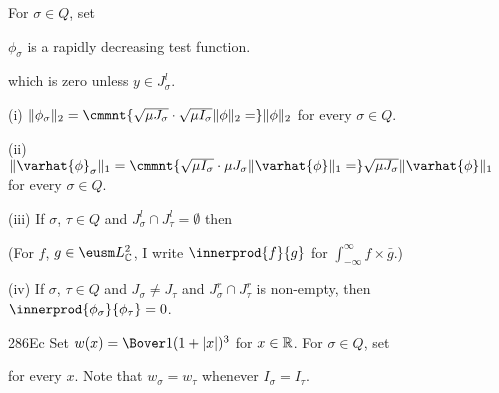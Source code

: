 For $\sigma\in Q$, set


\noindent{}$\phi_{\sigma}$ is a rapidly decreasing
test function.   


\noindent which is zero
unless $y\in J^l_{\sigma}$.   

\quad(i) $\|\phi_{\sigma}\|_2
=\cmmnt{\sqrt{\mu J_{\sigma}}\cdot\sqrt{\mu I_{\sigma}}\|\phi\|_2
=}\|\phi\|_2$
for every $\sigma\in Q$.

\quad(ii) $\|\varhat{\phi}_{\sigma}\|_1
=\cmmnt{\sqrt{\mu I_{\sigma}}\cdot\mu J_{\sigma}\|\varhat{\phi}\|_1
=}\sqrt{\mu J_{\sigma}}\|\varhat{\phi}\|_1$ for every $\sigma\in Q$.

\quad(iii) If $\sigma$, $\tau\in Q$ and
$J^l_{\sigma}\cap J^l_{\tau}=\emptyset$ then


\noindent{}(For $f$,
$g\in\eusm L_{\Bbb C}^2$, I
write $\innerprod{f}{g}$ for $\int_{-\infty}^{\infty}f\times\bar g$.)

\quad(iv) If $\sigma$, $\tau\in Q$ and
$J_{\sigma}\ne J_{\tau}$ and $J^r_{\sigma}\cap J^r_{\tau}$ is
non-empty, then
$\innerprod{\phi_{\sigma}}{\phi_{\tau}}=0$.

\spheader 286Ec Set $w(x)=\Bover1{(1+|x|)^3}$ for $x\in\Bbb R$.
For $\sigma\in Q$, set


\noindent for every
$x$.   Note that $w_{\sigma}=w_{\tau}$ whenever $I_{\sigma}=I_{\tau}$.

